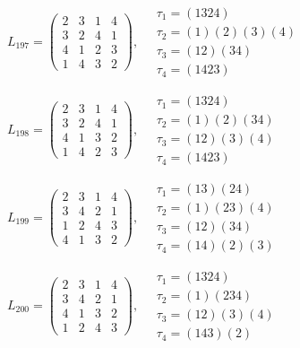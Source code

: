 $L_{197} = \begin{pmatrix} 2 & 3 & 1 & 4 \\ 3 & 2 & 4 & 1 \\ 4 & 1 & 2 & 3 \\ 1 & 4 & 3 & 2 \end{pmatrix}, \quad \begin{matrix} \tau_{1} = (1 3 2 4) \\ \tau_{2} = (1)(2)(3)(4) \\ \tau_{3} = (1 2)(3 4) \\ \tau_{4} = (1 4 2 3) \end{matrix}$

$L_{198} = \begin{pmatrix} 2 & 3 & 1 & 4 \\ 3 & 2 & 4 & 1 \\ 4 & 1 & 3 & 2 \\ 1 & 4 & 2 & 3 \end{pmatrix}, \quad \begin{matrix} \tau_{1} = (1 3 2 4) \\ \tau_{2} = (1)(2)(3 4) \\ \tau_{3} = (1 2)(3)(4) \\ \tau_{4} = (1 4 2 3) \end{matrix}$

$L_{199} = \begin{pmatrix} 2 & 3 & 1 & 4 \\ 3 & 4 & 2 & 1 \\ 1 & 2 & 4 & 3 \\ 4 & 1 & 3 & 2 \end{pmatrix}, \quad \begin{matrix} \tau_{1} = (1 3)(2 4) \\ \tau_{2} = (1)(2 3)(4) \\ \tau_{3} = (1 2)(3 4) \\ \tau_{4} = (1 4)(2)(3) \end{matrix}$

$L_{200} = \begin{pmatrix} 2 & 3 & 1 & 4 \\ 3 & 4 & 2 & 1 \\ 4 & 1 & 3 & 2 \\ 1 & 2 & 4 & 3 \end{pmatrix}, \quad \begin{matrix} \tau_{1} = (1 3 2 4) \\ \tau_{2} = (1)(2 3 4) \\ \tau_{3} = (1 2)(3)(4) \\ \tau_{4} = (1 4 3)(2) \end{matrix}$

